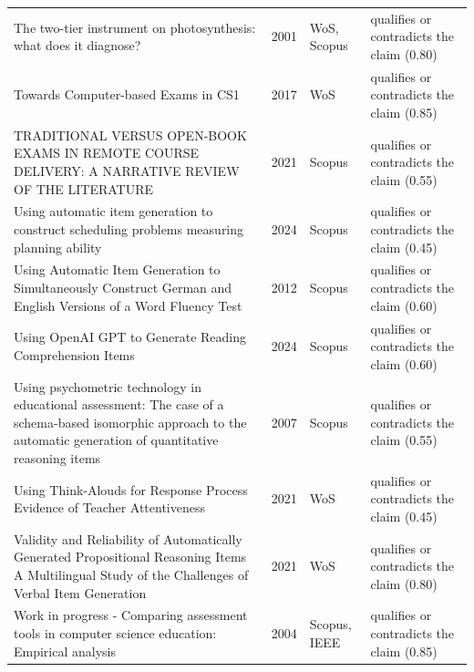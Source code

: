 \begin{longtable}{@{}%
  >{\raggedright\arraybackslash}p{}c%
  >{\raggedright\arraybackslash}p{}%
  >{\raggedright\arraybackslash}p{}@{}}
The two-tier instrument on photosynthesis: what does it diagnose? & 2001 & WoS, Scopus & qualifies or contradicts the claim (0.80) \\
Towards Computer-based Exams in CS1 & 2017 & WoS & qualifies or contradicts the claim (0.85) \\
TRADITIONAL VERSUS OPEN-BOOK EXAMS IN REMOTE COURSE DELIVERY: A NARRATIVE REVIEW OF THE LITERATURE & 2021 & Scopus & qualifies or contradicts the claim (0.55) \\
Using automatic item generation to construct scheduling problems measuring planning ability & 2024 & Scopus & qualifies or contradicts the claim (0.45) \\
Using Automatic Item Generation to Simultaneously Construct German and English Versions of a Word Fluency Test & 2012 & Scopus & qualifies or contradicts the claim (0.60) \\
Using OpenAI GPT to Generate Reading Comprehension Items & 2024 & Scopus & qualifies or contradicts the claim (0.60) \\
Using psychometric technology in educational assessment: The case of a schema-based isomorphic approach to the automatic generation of quantitative reasoning items & 2007 & Scopus & qualifies or contradicts the claim (0.55) \\
Using Think-Alouds for Response Process Evidence of Teacher Attentiveness & 2021 & WoS & qualifies or contradicts the claim (0.45) \\
Validity and Reliability of Automatically Generated Propositional Reasoning Items A Multilingual Study of the Challenges of Verbal Item Generation & 2021 & WoS & qualifies or contradicts the claim (0.80) \\
Work in progress - Comparing assessment tools in computer science education: Empirical analysis & 2004 & Scopus, IEEE & qualifies or contradicts the claim (0.85) \\
\end{longtable}
\endgroup
